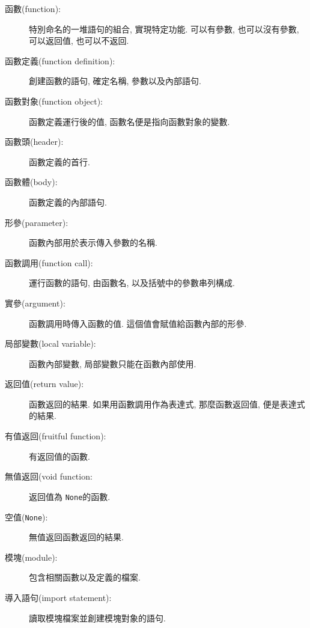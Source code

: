 \documentclass[10pt]{book}
\begin{document}
\begin{description}

\item[函數(function):] 特別命名的一堆語句的組合, 實現特定功能. 可以有參數, 
也可以沒有參數, 可以返回值, 也可以不返回. 

\item[函數定義(function definition):]  創建函數的語句, 確定名稱, 參數以及內部語句. 

\item[函數對象(function object):]  函數定義運行後的值, 函數名便是指向函數對象的變數. 

\item[函數頭(header):] 函數定義的首行.

\item[函數體(body):] 函數定義的內部語句.

\item[形參(parameter):] 函數內部用於表示傳入參數的名稱. 

\item[函數調用(function call):] 運行函數的語句, 由函數名, 以及括號中的參數串列構成. 

\item[實參(argument):]  函數調用時傳入函數的值. 這個值會賦值給函數內部的形參. 

\item[局部變數(local variable):]  函數內部變數, 局部變數只能在函數內部使用. 

\item[返回值(return value):]  函數返回的結果. 如果用函數調用作為表達式, 那麼函數返回值, 便是表達式的結果. 

\item[有值返回(fruitful function):] 有返回值的函數. 

\item[無值返回(void function:] 返回值為 {\tt None}的函數. 

\item[空值({\tt None}):] 無值返回函數返回的結果. 

\item[模塊(module):] 包含相關函數以及定義的檔案. 

\item[導入語句(import statement):] 讀取模塊檔案並創建模塊對象的語句. 


\end{description}
\end{document}

